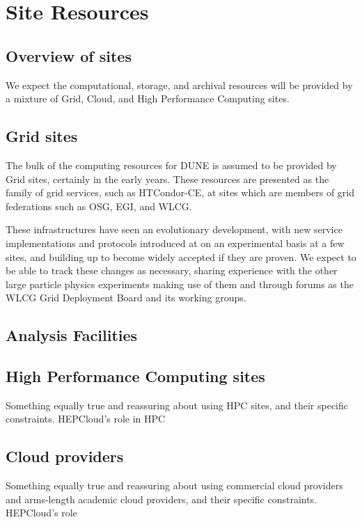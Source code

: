\documentclass[../main-v1.tex]{subfiles}
\begin{document}
\chapter{Site Resources }
\label{ch:sites}


\section{Overview of sites}
\label{sec:sites:overview}

We expect the computational, storage, and archival resources will be provided by a mixture of Grid, Cloud, and High Performance Computing sites. 

\section{Grid sites }
\label{sec:sites:grid}  %

The bulk of the computing resources for DUNE is assumed to be provided by Grid sites, certainly in the early years. These resources are presented as the family of grid services, such as HTCondor-CE, at sites which are members of grid federations such as OSG, EGI, and WLCG.

These infrastructures have seen an evolutionary development, with new service implementations and protocols introduced at on an experimental basis at a few sites, and building up to become widely accepted if they are proven. We expect to be able to track these changes as necessary, sharing experience with the other large particle physics experiments making use of them and through forums as the WLCG Grid Deployment Board and its working groups.


\section{Analysis Facilities } \label{sec:sites:anacluster}

\section{High Performance Computing sites }
\label{sec:sites:hpc}
Something equally true and reassuring about using HPC sites, and their specific constraints. HEPCloud's role in HPC

\section{Cloud providers}
\label{sec:sites:cloud}

Something equally true and reassuring about using commercial cloud providers and arms-length academic cloud providers, and their specific constraints. HEPCloud's role
\end{document}
